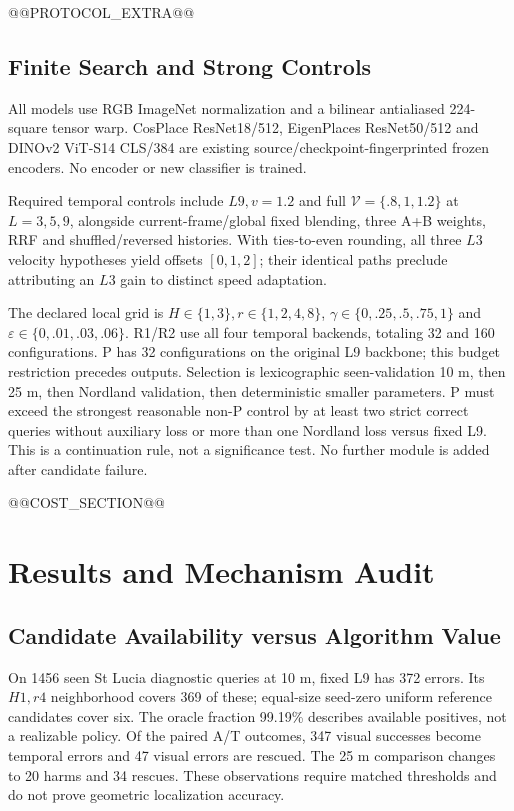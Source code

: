 \documentclass[conference]{IEEEtran}
\begin{document}
@@PROTOCOL_EXTRA@@

\subsection{Finite Search and Strong Controls}
All models use RGB ImageNet normalization and a bilinear antialiased 224-square tensor warp. CosPlace ResNet18/512, EigenPlaces ResNet50/512 and DINOv2 ViT-S14 CLS/384 are existing source/checkpoint-fingerprinted frozen encoders. No encoder or new classifier is trained.

Required temporal controls include $L9,v=1.2$ and full $\mathcal V=\{.8,1,1.2\}$ at $L=3,5,9$, alongside current-frame/global fixed blending, three A+B weights, RRF and shuffled/reversed histories. With ties-to-even rounding, all three $L3$ velocity hypotheses yield offsets $[0,1,2]$; their identical paths preclude attributing an $L3$ gain to distinct speed adaptation.

The declared local grid is $H\in\{1,3\},r\in\{1,2,4,8\}$, $\gamma\in\{0,.25,.5,.75,1\}$ and $\varepsilon\in\{0,.01,.03,.06\}$. R1/R2 use all four temporal backends, totaling 32 and 160 configurations. P has 32 configurations on the original L9 backbone; this budget restriction precedes outputs. Selection is lexicographic seen-validation 10 m, then 25 m, then Nordland validation, then deterministic smaller parameters. P must exceed the strongest reasonable non-P control by at least two strict correct queries without auxiliary loss or more than one Nordland loss versus fixed L9. This is a continuation rule, not a significance test. No further module is added after candidate failure.

@@COST_SECTION@@

\section{Results and Mechanism Audit}
\subsection{Candidate Availability versus Algorithm Value}
On 1456 seen St Lucia diagnostic queries at 10 m, fixed L9 has 372 errors. Its $H1,r4$ neighborhood covers 369 of these; equal-size seed-zero uniform reference candidates cover six. The oracle fraction 99.19\% describes available positives, not a realizable policy. Of the paired A/T outcomes, 347 visual successes become temporal errors and 47 visual errors are rescued. The 25 m comparison changes to 20 harms and 34 rescues. These observations require matched thresholds and do not prove geometric localization accuracy.
\end{document}
